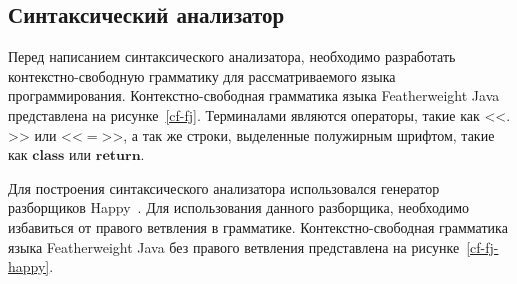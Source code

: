 \subsection{Синтаксический анализатор}
Перед написанием синтаксического анализатора, необходимо разработать контекстно-свободную грамматику для рассматриваемого языка программирования.
Контекстно-свободная грамматика языка Featherweight Java представлена на рисунке~\ref{cf-fj}.
Терминалами являются операторы, такие как <<$.$>> или <<$=$>>, а так же строки, выделенные полужирным шрифтом, такие как $\pmb{class}$ или $\pmb{return}$.

Для построения синтаксического анализатора использовался генератор разборщиков Happy~\cite{happy}.
Для использования данного разборщика, необходимо избавиться от правого ветвления в грамматике.
Контекстно-свободная грамматика языка Featherweight Java без правого ветвления представлена на рисунке~\ref{cf-fj-happy}.

